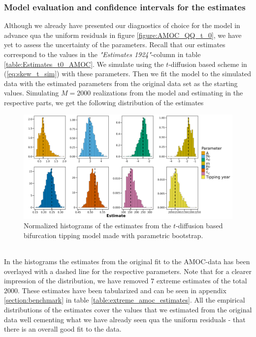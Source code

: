 \subsubsection{Model evaluation and confidence intervals for the estimates}
Although we already have presented our diagnostics of choice for the model in advance qua the uniform residuals in figure \ref{figure:AMOC_QQ_t_0}, we have yet to assess the uncertainty of the parameters. Recall that our estimates correspond to the values in the \textit{"Estimates 1924"}-column in table \ref{table:Estimates_t0_AMOC}. We simulate using the $t$-diffusion based scheme in (\ref{eq:skew_t_sim}) with these parameters. Then we fit the model to the simulated data with the estimated parameters from the original data set as the starting values. Simulating $M = 2000$ realizations from the model and estimating in the respective parts, we get the following distribution of the estimates
\begin{figure}[h!]
    \begin{center}
    \includegraphics[scale = .095]{figures/estim_tibble_plot.jpeg}
    \caption{Normalized histograms of the estimates from the $t$-diffusion based bifurcation tipping model made with parametric bootstrap.}
    \label{figure:AMOC_parametric_bootstrap}
    \end{center}
\end{figure}\\
In the histograms the estimates from the original fit to the AMOC-data has been overlayed with a dashed line for the respective parameters. Note that for a clearer impression of the distribution, we have removed $7$ extreme estimates of the total $2000$. These estimates have been tabularized and can be seen in appendix \ref{section:benchmark} in table \ref{table:extreme_amoc_estimates}. All the empirical distributions of the estimates cover the values that we estimated from the original data well cementing what we have already seen qua the uniform residuals - that there is an overall good fit to the data.
